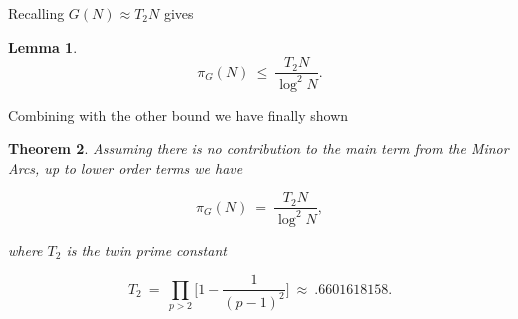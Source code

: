 \documentclass[12pt,letterpaper]{report}
\newcommand\be{\begin{equation}}
\newcommand\ee{\end{equation}}
\newtheorem{thm}{Theorem}[section]
\newtheorem{lem}[thm]{Lemma}
\begin{document}
Recalling $G(N) \approx T_2 N$ gives

\begin{lem} \be \pi_G(N) \ \le \ \frac{T_2 N}{\log^2 N}. \ee
\end{lem}

Combining with the other bound we have finally shown

\begin{thm} Assuming there is no contribution to the main term
from the Minor Arcs, up to lower order terms we have

\be \pi_G(N) \ = \ \frac{T_2 N}{\log^2 N}, \ee

where $T_2$ is the twin prime constant

\be T_2 \ = \ \prod_{p > 2} \Big[ 1 - \frac{1}{(p-1)^2} \Big] \
\approx \ .6601618158. \ee

\end{thm}


\end{document}
